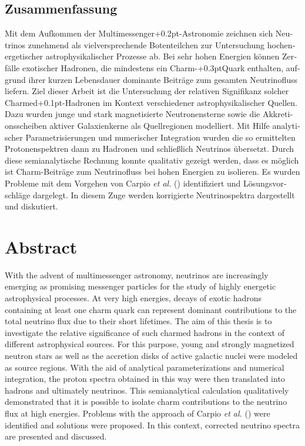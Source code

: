 \begin{otherlanguage}{ngerman}
	\chapter*{Zusammenfassung}

	Mit dem Aufkommen der Multimessenger{\kern+0.2pt}-Astronomie zeichnen sich Neutrinos zunehmend als vielversprechende
	Botenteilchen zur Untersuchung hochenergetischer astrophysikalischer Prozesse ab. Bei sehr hohen Energien können Zerfälle
	exotischer Hadronen, die mindestens ein Charm-{\kern+0.3pt}Quark enthalten, aufgrund ihrer kurzen Lebensdauer dominante
	Beiträge zum gesamten Neutrinofluss liefern. Ziel dieser Arbeit ist die Untersuchung der relativen Signifikanz solcher
	Charmed{\kern+0.1pt}-Hadronen im Kontext verschiedener astrophysikalischer Quellen. Dazu wurden junge und stark
	magnetisierte Neutronensterne sowie die Akkretionsscheiben aktiver Galaxienkerne als Quellregionen modelliert.
	Mit Hilfe analytischer Parametrisierungen und numerischer Integration wurden die so ermittelten Protonenspektren
	dann zu Hadronen und schließlich Neutrinos übersetzt. Durch diese semianalytische Rechnung konnte qualitativ
	gezeigt werden, dass es möglich ist Charm-Beiträge zum Neutrinofluss bei hohen Energien zu isolieren. Es wurden
	Probleme mit dem Vorgehen von Carpio \emph{et al.} () identifiziert und Lösungsvorschläge
	dargelegt. In diesem Zuge werden korrigierte Neutrinospektra dargestellt und diskutiert.

\end{otherlanguage}



{\let\clearpage\relax\chapter*{Abstract}\label{ch:abstract}}

With the advent of multimessenger astronomy, neutrinos are increasingly emerging as promising messenger particles for the
study of highly energetic astrophysical processes. At very high energies, decays of exotic hadrons containing at least one
charm quark can represent dominant contributions to the total neutrino flux due to their short lifetimes. The aim of this
thesis is to investigate the relative significance of such charmed hadrons in the context of different astrophysical sources.
For this purpose, young and strongly magnetized neutron stars as well as the accretion disks of active galactic nuclei were
modeled as source regions. With the aid of analytical parameterizations and numerical integration, the proton spectra obtained
in this way were then translated into hadrons and ultimately neutrinos. This semianalytical calculation qualitatively
demonstrated that it is possible to isolate charm contributions to the neutrino flux at high energies. Problems
with the approach of Carpio \emph{et al.} () were identified and solutions were proposed.
In this context, corrected neutrino spectra are presented and discussed.
